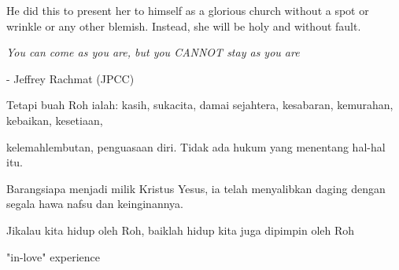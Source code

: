 \documentclass{beamer}
\begin{document}
\begin{frame}{}
	\Large
	\begin{tcolorbox}[colback=green!5,colframe=green!40!black,title=Efesus 5:27 (NLT)]
		He did this to present her to himself as a glorious church without a spot or wrinkle or any other blemish. Instead, she will be holy and without fault.
	\end{tcolorbox}
\end{frame}

\begin{frame}{}
	\LARGE
	\centering
	\textit{You can come as you are, but you CANNOT stay as you are}
	
	\bigskip
	\normalsize
	- Jeffrey Rachmat (JPCC)
\end{frame}


\begin{frame}{}
	\Large
	\begin{tcolorbox}[colback=green!5,colframe=green!40!black,title=Galatia 5:22 (TB)]
		Tetapi buah Roh ialah: kasih, sukacita, damai sejahtera, kesabaran, kemurahan, kebaikan, kesetiaan,
	\end{tcolorbox}
\end{frame}

\begin{frame}{}
	\Large
	\begin{tcolorbox}[colback=green!5,colframe=green!40!black,title=Galatia 5:23 (TB)]
		kelemahlembutan, penguasaan diri. Tidak ada hukum yang menentang hal-hal itu.
	\end{tcolorbox}
\end{frame}

\begin{frame}{}
	\Large
	\begin{tcolorbox}[colback=green!5,colframe=green!40!black,title=Galatia 5:24 (TB)]
		Barangsiapa menjadi milik Kristus Yesus, ia telah menyalibkan daging dengan segala hawa nafsu dan keinginannya.
	\end{tcolorbox}
\end{frame}

\begin{frame}{}
	\Large
	\begin{tcolorbox}[colback=green!5,colframe=green!40!black,title=Galatia 5:25 (TB)]
		Jikalau kita hidup oleh Roh, baiklah hidup kita juga dipimpin oleh Roh
	\end{tcolorbox}
\end{frame}

\begin{frame}{}
	\LARGE
	\centering
	"in-love" experience
\end{frame}
\end{document}
